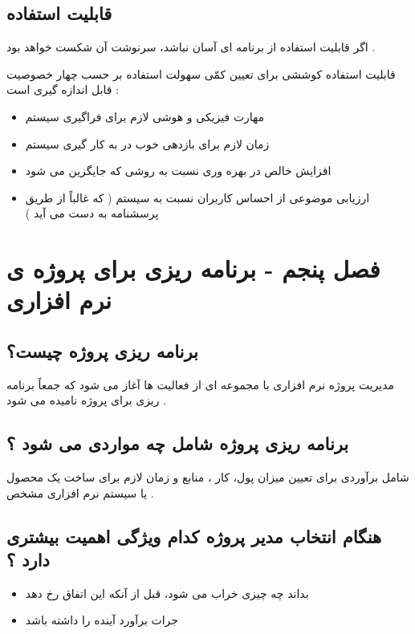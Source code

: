 \documentclass{article}
\begin{document}
\subsection{قابلیت استفاده}
اگر قابلیت استفاده از برنامه ای آسان نباشد، سرنوشت آن شکست خواهد بود .

قابلیت استفاده کوششی برای تعیین کمّی سهولت استفاده بر حسب چهار خصوصیت قابل اندازه گیری است :

\begin{itemize}
	\item مهارت فیزیکی و هوشی لازم برای فراگیری سیستم
	\item زمان لازم برای بازدهی خوب در به کار گیری سیستم
	\item افزایش خالص در بهره وری نسبت به روشی که جایگزین می شود
	\item ارزیابی موضوعی از احساس کاربران نسبت به سیستم ( که غالباً از طریق پرسشنامه به دست می آید )
\end{itemize}



\section{فصل پنجم - برنامه ریزی برای پروژه ی نرم افزاری}


\subsection{برنامه ریزی پروژه چیست؟}

مدیریت پروژه نرم افزاری با مجموعه ای از فعالیت ها آغاز می شود که جمعاً برنامه ریزی برای پروژه نامیده می شود .


\subsection{برنامه ریزی پروژه شامل چه مواردی می شود ؟}

شامل برآوردی برای تعیین میزان پول، کار ، منابع و زمان لازم برای ساخت یک محصول یا سیستم نرم افزاری مشخص .


\subsection{هنگام انتخاب مدیر پروژه کدام ویژگی اهمیت بیشتری دارد ؟}
\begin{itemize}
	\item بداند چه چیزی خراب می شود، قبل از آنکه این اتفاق رخ دهد
	\item جرات برآورد آینده را داشته باشد
\end{itemize}
\end{document}
